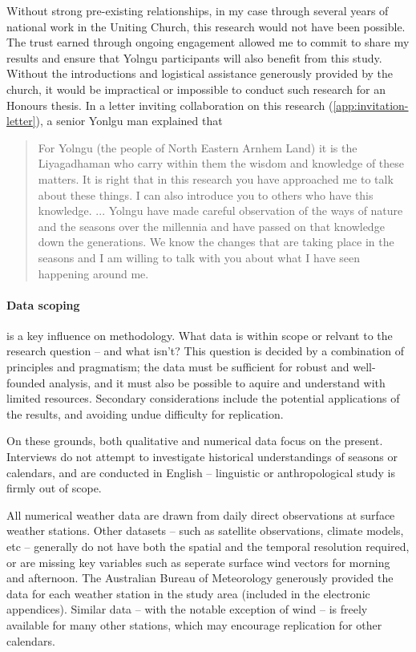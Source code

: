 Without strong pre-existing relationships, in my case through several
years of national work in the Uniting Church, this research would not
have been possible.  The trust earned through ongoing engagement allowed
me to commit to share my results and ensure that Yolngu participants will
also benefit from this study.  Without the introductions and logistical
assistance generously provided by the church, it would be impractical or
impossible to conduct such research for an Honours thesis.
%
In a letter inviting collaboration on this research (\cref{app:invitation-letter}),
a senior Yonlgu man explained that
\begin{quote}
    For Yolngu (the people of North Eastern Arnhem Land) it is the Liyagadhaman
    who carry within them the wisdom and knowledge of these matters.
    It is right that in this research you have approached me to talk about these
    things. I can also introduce you to others who have this knowledge.
    ...
    Yolngu have made careful observation of the ways of nature and the seasons
    over the millennia and have passed on that knowledge down the generations.
    We know the changes that are taking place in the seasons and I am willing
    to talk with you about what I have seen happening around me.
\end{quote}


\paragraph{Data scoping} is a key influence on methodology.
What data is within scope or relvant to the research question --
and what isn't?
%
This question is decided by a combination of principles and pragmatism;
the data must be sufficient for robust and well-founded analysis,
and it must also be possible to aquire and understand with limited
resources.  Secondary considerations include the potential applications
of the results, and avoiding undue difficulty for replication.

On these grounds, both qualitative and numerical data focus on the present.
Interviews do not attempt to investigate historical understandings of
seasons or calendars, and are conducted in English -- linguistic or
anthropological study is firmly out of scope.

All numerical weather data are drawn from daily direct observations at
surface weather stations.  Other datasets -- such as satellite observations,
climate models, etc -- generally do not have both the spatial and the
temporal resolution required, or are missing key variables such as seperate
surface wind vectors for morning and afternoon.
%
The Australian Bureau of Meteorology generously provided the data for each
weather station in the study area (included in the electronic appendices).
Similar data -- with the notable exception of wind -- is freely available
for many other stations, which may encourage replication for other
calendars.


